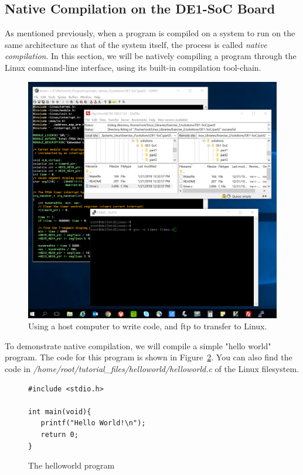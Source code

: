 \documentclass[11pt, twoside, pdftex]{article}
\begin{document}
\subsection{Native Compilation on the DE1-SoC Board}
\label{sec:native_compile}

As mentioned previously, when a program is compiled on a system to run on the same architecture
as that of the system itself, the process is called {\it native compilation}. In this section,
we will be natively compiling a program through the Linux command-line interface, using its 
built-in compilation tool-chain.

\begin{figure}[H]
   \begin{center}
       \includegraphics[width=\textwidth]{figures/dev_setup_2.png}
   \end{center}
   \caption{Using a host computer to write code, and ftp to transfer to Linux.}
	\label{fig:dev_setup}
\end{figure}

To demonstrate native compilation, we will compile a simple "hello world" program. The code 
for this program is shown in Figure~\ref{fig:helloworld_code}. You can also find the code 
in \textit{/home/root/tutorial\_files/helloworld/helloworld.c} of the Linux filesystem.

\lstset{language=C,numbers=left}
\begin{figure}[H]
\begin{center}
\begin{minipage}[t]{16 cm}
\begin{lstlisting}
#include <stdio.h>

int main(void){
   printf("Hello World!\n");
   return 0;
}
\end{lstlisting}
\end{minipage}
\end{center}
\vspace{-0.33in}\caption{The helloworld program}
\label{fig:helloworld_code}
\end{figure}
\end{document}
